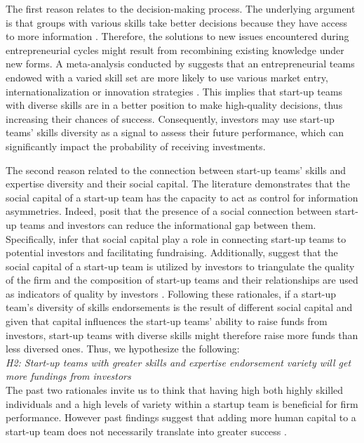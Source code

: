 \documentclass[12pt]{article}
\begin{document}
The first reason relates to the decision-making process. The underlying argument is that groups with various skills take better decisions because they have access to more information \citep{hong2001problem}. Therefore, the solutions to new issues encountered during entrepreneurial cycles might result from recombining existing knowledge under new forms. A meta-analysis conducted by \citet{jin2017entrepreneurial} suggests that an entrepreneurial teams endowed with a varied skill set are more likely to use various market entry, internationalization or innovation strategies \citep{boeker1989strategic}. This implies that start-up teams with diverse skills are in a better position to make high-quality decisions, thus increasing their chances of success. Consequently, investors may use start-up teams' skills diversity as a signal to assess their future performance, which can significantly impact the probability of receiving investments.

The second reason related to the connection between start-up teams' skills and expertise diversity and their social capital. The literature demonstrates that the social capital of a start-up team has the capacity to act as control for information asymmetries. Indeed, \citet{huang2017resources, shane2002organizational} posit that the presence of a social connection between start-up teams and investors can reduce the informational gap between them. Specifically, \citet{shane2002network} infer that social capital play a role in connecting start-up teams to potential investors and facilitating fundraising. Additionally, \citet{hoenig2015quality} suggest that the social capital of a start-up team is utilized by investors to triangulate the quality of the firm and the composition of start-up teams and their relationships are used as indicators of quality by investors \citep{plummer2016better, semrau2014exactly}. Following these rationales, if a start-up team's diversity of skills endorsements is the result of different social capital and given that capital influences the start-up teams' ability to raise funds from investors, start-up teams with diverse skills might therefore raise more funds than less diversed ones. Thus, we hypothesize the following: \\

\noindent \textit{H2: Start-up teams with greater skills and expertise endorsement variety will get more fundings from investors} \\

The past two rationales invite us to think that having high both highly skilled individuals and a high levels of variety within a startup team is beneficial for firm performance. However past findings suggest that adding more human capital to a start-up team does not necessarily translate into greater success \citep{pierce2013too}.
\end{document}
